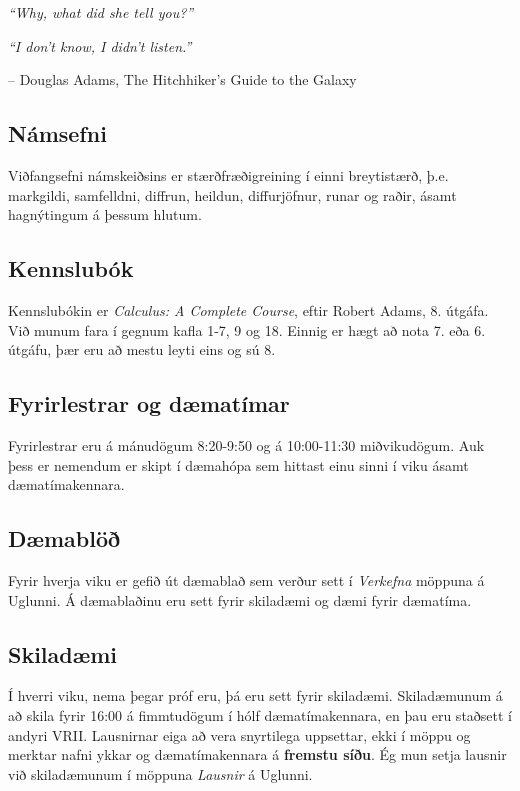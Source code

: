 \documentclass[a4paper,10pt,icelandic]{sphinxmanual}
\begin{document}
\emph{``Why, what did she tell you?''}

\emph{``I don't know, I didn't listen.”}

-- Douglas Adams, The Hitchhiker's Guide to the Galaxy


\subsection{Námsefni}
\label{vidauki:namsefni}
Viðfangsefni námskeiðsins er stærðfræðigreining í einni
breytistærð, þ.e. markgildi, samfelldni, diffrun, heildun, diffurjöfnur,
runar og raðir, ásamt hagnýtingum á þessum hlutum.


\subsection{Kennslubók}
\label{vidauki:kennslubok}
Kennslubókin er \emph{Calculus: A Complete Course}, eftir
Robert Adams, 8. útgáfa. Við munum fara í gegnum kafla 1-7, 9 og
18. Einnig er hægt að nota 7. eða 6. útgáfu, þær eru að mestu leyti eins og sú 8.


\subsection{Fyrirlestrar og dæmatímar}
\label{vidauki:fyrirlestrar-og-daematimar}
Fyrirlestrar eru á mánudögum 8:20-9:50 og á
10:00-11:30 miðvikudögum. Auk þess er nemendum er skipt
í dæmahópa sem hittast einu sinni í viku ásamt dæmatímakennara.


\subsection{Dæmablöð}
\label{vidauki:daemablo}
Fyrir hverja viku er gefið út dæmablað sem
verður sett í \emph{Verkefna} möppuna á Uglunni. Á dæmablaðinu eru sett fyrir
skiladæmi og dæmi fyrir dæmatíma.


\subsection{Skiladæmi}
\label{vidauki:skiladaemi}
Í hverri viku, nema þegar próf eru, þá eru sett fyrir
skiladæmi. Skiladæmunum á að skila fyrir 16:00 á fimmtudögum í hólf
dæmatímakennara, en þau eru staðsett í andyri VRII. Lausnirnar eiga að
vera snyrtilega uppsettar, ekki í möppu og merktar nafni ykkar og
dæmatímakennara á \textbf{fremstu síðu}. Ég mun setja lausnir við
skiladæmunum í möppuna \emph{Lausnir} á Uglunni.
\end{document}
